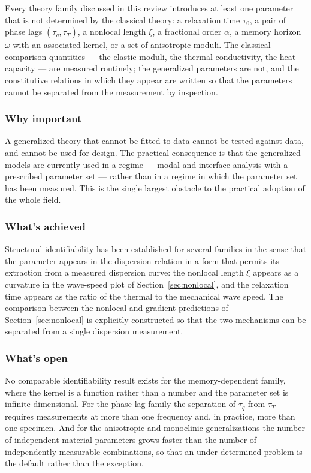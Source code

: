 Every theory family discussed in this review introduces at least one parameter that is not determined by the classical theory: a relaxation time $\tau_0$, a pair of phase lags $(\tau_q, \tau_T)$, a nonlocal length $\xi$, a fractional order $\alpha$, a memory horizon $\omega$ with an associated kernel, or a set of anisotropic moduli. The classical comparison quantities --- the elastic moduli, the thermal conductivity, the heat capacity --- are measured routinely; the generalized parameters are not, and the constitutive relations in which they appear are written so that the parameters cannot be separated from the measurement by inspection.

\subsubsection{Why important}

A generalized theory that cannot be fitted to data cannot be tested against data, and cannot be used for design. The practical consequence is that the generalized models are currently used in a regime --- modal and interface analysis with a prescribed parameter set --- rather than in a regime in which the parameter set has been measured. This is the single largest obstacle to the practical adoption of the whole field.

\subsubsection{What's achieved}

Structural identifiability has been established for several families in the sense that the parameter appears in the dispersion relation in a form that permits its extraction from a measured dispersion curve: the nonlocal length $\xi$ appears as a curvature in the wave-speed plot of Section~\ref{sec:nonlocal}, and the relaxation time appears as the ratio of the thermal to the mechanical wave speed. The comparison between the nonlocal and gradient predictions of Section~\ref{sec:nonlocal} is explicitly constructed so that the two mechanisms can be separated from a single dispersion measurement.

\subsubsection{What's open}

No comparable identifiability result exists for the memory-dependent family, where the kernel is a function rather than a number and the parameter set is infinite-dimensional. For the phase-lag family the separation of $\tau_q$ from $\tau_T$ requires measurements at more than one frequency and, in practice, more than one specimen. And for the anisotropic and monoclinic generalizations the number of independent material parameters grows faster than the number of independently measurable combinations, so that an under-determined problem is the default rather than the exception.

